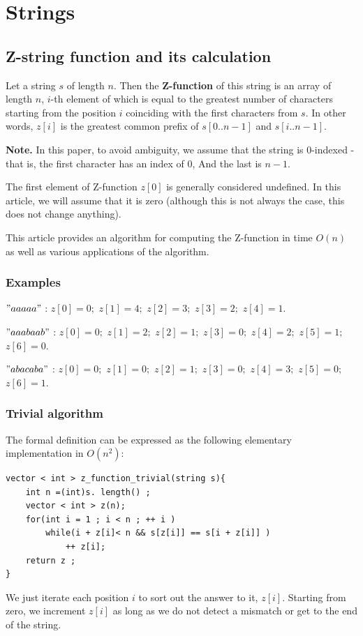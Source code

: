 \chapter{Strings}

\section{ Z-string function and its calculation } %
Let a string $s$ of length $n$. Then the \textbf{Z-function} of this string is an array of length $n$, $i$-th element of which is equal to the greatest number of characters starting from the position $i$ coinciding with the first characters from $s$. In other words, $z [i]$ is the greatest common prefix of $s[0..n-1]$ and $s[i..n-1]$.

\textbf{Note.} In this paper, to avoid ambiguity, we assume that the string is 0-indexed - that is, the first character has an index of $0$, And the last is $n-1$.

The first element of Z-function $z [0]$ is generally considered undefined. In this article, we will assume that it is zero (although this is not always the case, this does not change anything).

This article provides an algorithm for computing the Z-function in time $O (n)$ as well as various applications of the algorithm.

\subsection{ Examples }

$" aaaaa"$ :
$z [0] = 0;$
$z [1] = 4;$
$z [2] = 3;$
$z [3] = 2;$
$z [4] = 1.$

$" aaabaab"$ :
$z [0] = 0;$
$z [1] = 2;$
$z [2] = 1;$
$z [3] = 0;$
$z [4] = 2;$
$z [5] = 1;$
$z [6] = 0.$

$" abacaba"$ :
$z [0] = 0;$
$z [1] = 0;$
$z [2] = 1;$
$z [3] = 0;$
$z [4] = 3;$
$z [5] = 0;$
$z [6] = 1.$

\subsection{ Trivial algorithm }

The formal definition can be expressed as the following elementary implementation in $O (n ^ 2)$:

\begin{verbatim}
vector < int > z_function_trivial(string s){
    int n =(int)s. length() ;
    vector < int > z(n);
    for(int i = 1 ; i < n ; ++ i )
        while(i + z[i]< n && s[z[i]] == s[i + z[i]] )
            ++ z[i];
    return z ;
} 
\end{verbatim}
We just iterate each position $i$ to sort out the answer to it, $z [i]$. Starting from zero, we increment $z[i]$ as long as we do not detect a mismatch or get to the end of the string.

